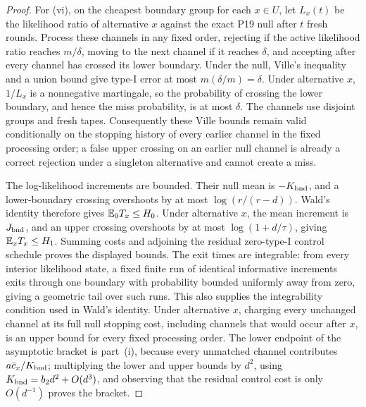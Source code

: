 \begin{proof}
For (vi), on the cheapest boundary group for each \(x\in U\), let \(L_x(t)\)
be the likelihood ratio of alternative \(x\) against the exact P19 null after
\(t\) fresh rounds.  Process these channels in any fixed order, rejecting if
the active likelihood ratio reaches \(m/\delta\), moving to the next channel
if it reaches \(\delta\), and accepting after every channel has crossed its
lower boundary.  Under the null, Ville's inequality and a union bound give
type-I error at most \(m(\delta/m)=\delta\).  Under alternative \(x\),
\(1/L_x\) is a nonnegative martingale, so the probability of crossing the
lower boundary, and hence the miss probability, is at most \(\delta\).
The channels use disjoint groups and fresh tapes.  Consequently these Ville
bounds remain valid conditionally on the stopping history of every earlier
channel in the fixed processing order; a false upper crossing on an earlier
null channel is already a correct rejection under a singleton alternative and
cannot create a miss.

The log-likelihood increments are bounded.  Their null mean is
\(-K_{\rm bnd}\), and a lower-boundary crossing overshoots by at most
\(\log(r/(r-d))\).  Wald's identity therefore gives
\(\mathbb{E}_0T_x\le H_0\).  Under alternative \(x\), the mean increment is
\(J_{\rm bnd}\), and an upper crossing overshoots by at most
\(\log(1+d/\tau)\), giving \(\mathbb{E}_xT_x\le H_1\).  Summing costs and adjoining
the residual zero-type-I control schedule proves the displayed bounds.  The
exit times are integrable: from every interior likelihood state, a fixed
finite run of identical informative increments exits through one boundary
with probability bounded uniformly away from zero, giving a geometric tail
over such runs.  This also supplies the integrability condition used in
Wald's identity.  Under alternative \(x\), charging every unchanged channel
at its full null stopping cost, including channels that would occur after
\(x\), is an upper bound for every fixed processing order.  The
lower endpoint of the asymptotic bracket is part~(i), because every unmatched
channel contributes \(a\bar c_x/K_{\rm bnd}\); multiplying the lower and upper
bounds by \(d^2\), using \(K_{\rm bnd}=b_2d^2+O(d^3)\), and observing that the
residual control cost is only \(O(d^{-1})\) proves the bracket.


\end{proof}
